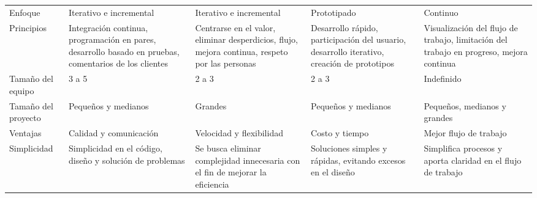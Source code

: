 \begin{longtable}{|p{3cm}|p{2.5cm}|p{2.5cm}|p{2.5cm}|p{2.5cm}|}
    \hline \hline
    \endlastfoot
    Enfoque                                        & Iterativo e incremental                                                                                & Iterativo e incremental                                                                        & Prototipado                                                                                & Continuo                                                                                \\
    Principios                                     & Integración continua, programación en pares, desarrollo basado en pruebas, comentarios de los clientes & Centrarse en el valor, eliminar desperdicios, flujo, mejora continua, respeto por las personas & Desarrollo rápido, participación del usuario, desarrollo iterativo, creación de prototipos & Visualización del flujo de trabajo, limitación del trabajo en progreso, mejora continua \\
    Tamaño del equipo                              & 3 a 5                                                                                                  & 2 a 3                                                                                          & 2 a 3                                                                                      & Indefinido                                                                              \\
    Tamaño del proyecto                            & Pequeños y medianos                                                                                    & Grandes                                                                                        & Pequeños y medianos                                                                        & Pequeños, medianos y grandes                                                            \\
    Ventajas                                       & Calidad y comunicación                                                                                 & Velocidad y flexibilidad                                                                       & Costo y tiempo                                                                             & Mejor flujo de trabajo                                                                  \\
    Simplicidad                                    & Simplicidad en el código, diseño y solución de problemas                                               & Se busca eliminar complejidad innecesaria con el fin de mejorar la eficiencia                  & Soluciones simples y rápidas, evitando excesos en el diseño                                & Simplifica procesos y aporta claridad en el flujo de trabajo                            \\

\end{longtable}
